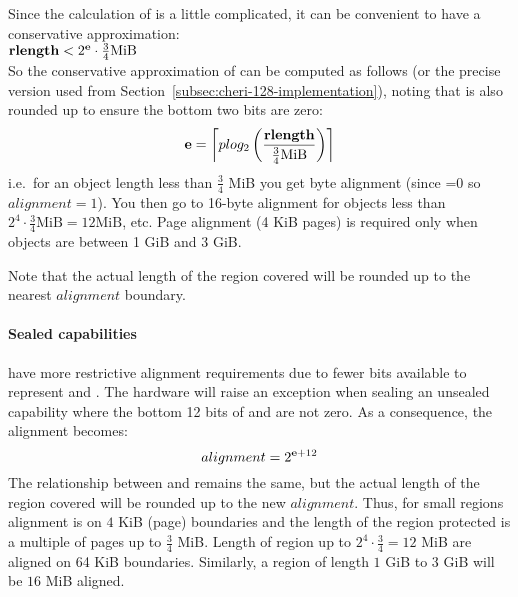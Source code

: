 Since the calculation of \cexponent{} is a little complicated, it can be
convenient to have a conservative approximation:\\

\hspace{1em}\(\textbf{rlength}{} <  2^{\bf e}{} \cdot \frac{3}{4} \text{MiB}\)\\

\noindent
So the conservative approximation of \cexponent{} can be computed as
follows (or the precise version used from
Section~\ref{subsec:cheri-128-implementation}), noting that \cexponent{}
is also rounded up to ensure the bottom two bits are zero:
\[{\bf e} = \left\lceil plog_2 \left (\frac{\textbf{rlength}{}}{\frac{3}{4} \text{MiB}} \right) \right\rceil\]
i.e.\ for an object length less than $\frac{3}{4}$ MiB you get byte
alignment (since \cexponent{}=0 so $alignment=1$).  You then go to 16-byte alignment
for objects less than $2^4 \cdot \frac{3}{4} \text{MiB} = 12 \text{MiB}$, etc.  Page
alignment (4 KiB pages) is required only when objects are between 1 GiB
and 3 GiB.

Note that the actual length of the region covered will be rounded up to the nearest $alignment$ boundary.

\paragraph{Sealed capabilities}
have more restrictive alignment requirements due to fewer bits
available to represent \cT{} and \cB{}.  The hardware will
raise an exception when sealing an unsealed capability where the
bottom 12 bits of \cT{} and \cB{} are not zero.  As a
consequence, the alignment becomes:
\[alignment = 2^{{\bf e}{}+12}\] The relationship between \rlength{}
and \cexponent{} remains the same, but the actual length of the region
covered will be rounded up to the new $alignment$.  Thus, for small
regions alignment is on $4$ KiB (page) boundaries and the length of the
region protected is a multiple of pages up to $\frac{3}{4}$ MiB.
Length of region up to $2^4 \cdot \frac{3}{4} = 12$ MiB are aligned on
64 KiB boundaries.  Similarly, a region of length $1$ GiB to
$3$ GiB will be $16$ MiB aligned.

